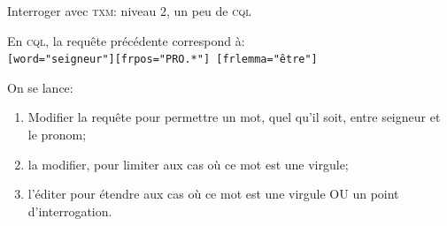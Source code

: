 \documentclass{beamer}
\begin{document}
\begin{frame}{Interroger avec \textsc{txm}: niveau 2, un peu de \textsc{cql}}
	
	En \textsc{cql}, la requête précédente correspond à:\\
	\texttt{[word="seigneur"][frpos="PRO.*"] [frlemma="être"] }
	
	On se lance:
	\begin{enumerate}
		\item Modifier la requête pour permettre un mot, quel qu'il soit, entre seigneur et le pronom;
		\item la modifier, pour limiter aux cas où ce mot est une virgule;
		\item l'éditer pour étendre aux cas où ce mot est une virgule OU un point d'interrogation.
	\end{enumerate}
	
\end{frame}
\end{document}
